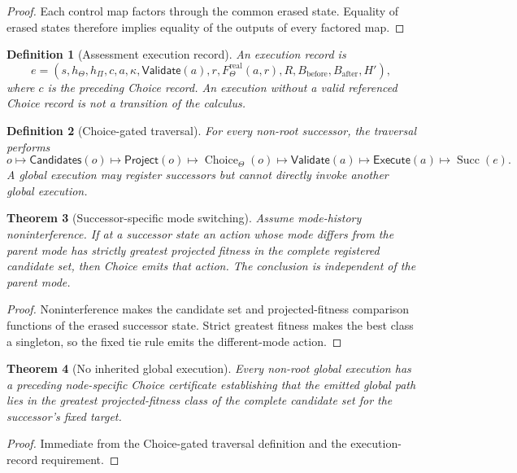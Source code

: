 \documentclass[10pt]{article}
\newtheorem{definition}{Definition}[section]
\newtheorem{theorem}[definition]{Theorem}
\newcommand{\Choice}{\operatorname{Choice}}
\newcommand{\Succ}{\operatorname{Succ}}
\newcommand{\RealFit}{F^{\mathrm{real}}}
\newcommand{\Candidates}{\mathsf{Candidates}}
\newcommand{\Project}{\mathsf{Project}}
\newcommand{\Validate}{\mathsf{Validate}}
\newcommand{\Execute}{\mathsf{Execute}}
\newcommand{\Target}{\Theta}
\begin{document}
\begin{proof}
Each control map factors through the common erased state.  Equality of erased states therefore implies equality of the outputs of every factored map.
\end{proof}

\begin{definition}[Assessment execution record]
An execution record is
\[
  e=(s,h_\Target,h_\Pi,c,a,\kappa,\Validate(a),r,
  \RealFit_\Target(a,r),R,B_{\mathrm{before}},B_{\mathrm{after}},H'),
\]
where $c$ is the preceding Choice record.  An execution without a valid referenced Choice record is not a transition of the calculus.
\end{definition}

\begin{definition}[Choice-gated traversal]
For every non-root successor, the traversal performs
\[
  o\mapsto\Candidates(o)\mapsto\Project(o)
  \mapsto\Choice_\Target(o)\mapsto\Validate(a)
  \mapsto\Execute(a)\mapsto\Succ(e).
\]
A global execution may register successors but cannot directly invoke another global execution.
\end{definition}

\begin{theorem}[Successor-specific mode switching]\label{thm:mode-switch}
Assume mode-history noninterference.  If at a successor state an action whose mode differs from the parent mode has strictly greatest projected fitness in the complete registered candidate set, then Choice emits that action.  The conclusion is independent of the parent mode.
\end{theorem}

\begin{proof}
Noninterference makes the candidate set and projected-fitness comparison functions of the erased successor state.  Strict greatest fitness makes the best class a singleton, so the fixed tie rule emits the different-mode action.
\end{proof}

\begin{theorem}[No inherited global execution]\label{cor:no-inheritance}
Every non-root global execution has a preceding node-specific Choice certificate establishing that the emitted global path lies in the greatest projected-fitness class of the complete candidate set for the successor's fixed target.
\end{theorem}

\begin{proof}
Immediate from the Choice-gated traversal definition and the execution-record requirement.
\end{proof}
\end{document}
